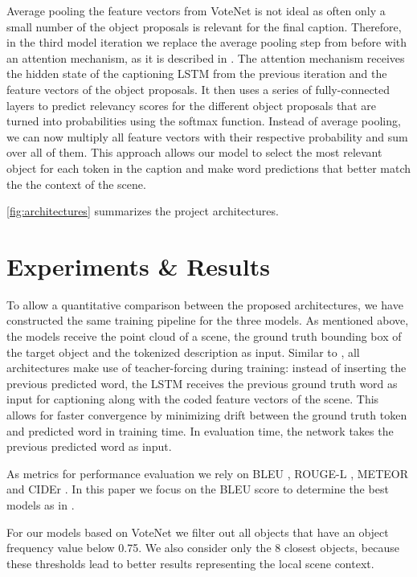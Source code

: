 \documentclass[10pt,twocolumn,letterpaper]{article}
\begin{document}
Average pooling the feature vectors from VoteNet is not ideal as often only a small number of the object proposals is relevant for the final caption. Therefore, in the third model iteration we replace the average pooling step from before with an attention mechanism, as it is described in \cite{xu2015show}. The attention mechanism receives the hidden state of the captioning LSTM from the previous iteration and the feature vectors of the object proposals. It then uses a series of fully-connected layers to predict relevancy scores for the different object proposals that are turned into probabilities using the softmax function. Instead of average pooling, we can now multiply all feature vectors with their respective probability and sum over all of them. This approach allows our model to select the most relevant object for each token in the caption and make word predictions that better match the the context of the scene.

\autoref{fig:architectures} summarizes the project architectures.

\section{Experiments \& Results}

To allow a quantitative comparison between the proposed architectures, we have constructed the same training pipeline for the three models. As mentioned above, the models receive the point cloud of a scene, the ground truth bounding box of the target object and the tokenized description as input.
Similar to \cite{xu2015show}, all architectures make use of teacher-forcing during training: instead of inserting the previous predicted word, the LSTM receives the previous ground truth word as input for captioning along with the coded feature vectors of the scene.  This allows for faster convergence by minimizing drift between the ground truth token and predicted word in training time. In evaluation time, the network takes the previous predicted word as input. 

As metrics for performance evaluation we rely on BLEU \cite{Papineni2002BleuAM}, ROUGE-L \cite{Lin2004ROUGEAP}, METEOR \cite{Denkowski2014MeteorUL} and CIDEr \cite{DBLP:journals/corr/VedantamZP14a}.  In this paper we focus on the BLEU score to determine the best models as in \cite{xu2015show}. 

For our models based on VoteNet we filter out all objects that have an object frequency value below 0.75. We also consider only the 8 closest objects, because these thresholds lead to better results representing the local scene context.   
\end{document}
